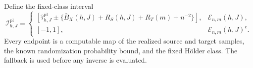 Define the fixed-class interval
\[
\mathcal I^{\mathrm{pl}}_{h,J}=\begin{cases}
\left[\widehat\tau^{\mathrm{pl}}_{h,J}\pm\{\overline B_X(h,J)+R_S(h,J)+R_T(m)+n^{-2}\}\right],&\mathcal E_{n,m}(h,J),\\
[-1,1],&\mathcal E_{n,m}(h,J)^c.
\end{cases}
\]
Every endpoint is a computable map of the realized source and target samples, the known randomization probability bound, and the fixed Hölder class.  The fallback is used before any inverse is evaluated.